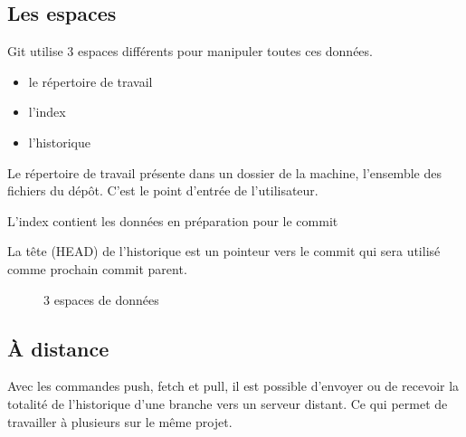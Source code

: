 \documentclass[a4paper]{article}
\begin{document}
\subsection*{Les espaces}
Git utilise 3 espaces différents pour manipuler toutes ces données.
\begin{itemize}
\item le répertoire de travail
\item l'index
\item l'historique
\end{itemize}

Le répertoire de travail présente dans un dossier de la machine, l'ensemble des fichiers du dépôt. C'est le point d'entrée de l'utilisateur.

L'index contient les données en préparation pour le commit

La tête (HEAD) de l'historique est un pointeur vers le commit qui sera utilisé comme prochain commit parent.

\begin{figure}[h]
  \center
  \caption{3 espaces de données}
\end{figure}

\subsection*{À distance}
Avec les commandes push, fetch et pull, il est possible d'envoyer ou de recevoir la totalité de l'historique d'une branche vers un serveur distant. Ce qui permet de travailler à plusieurs sur le même projet.

\vspace{2mm}
\end{document}
